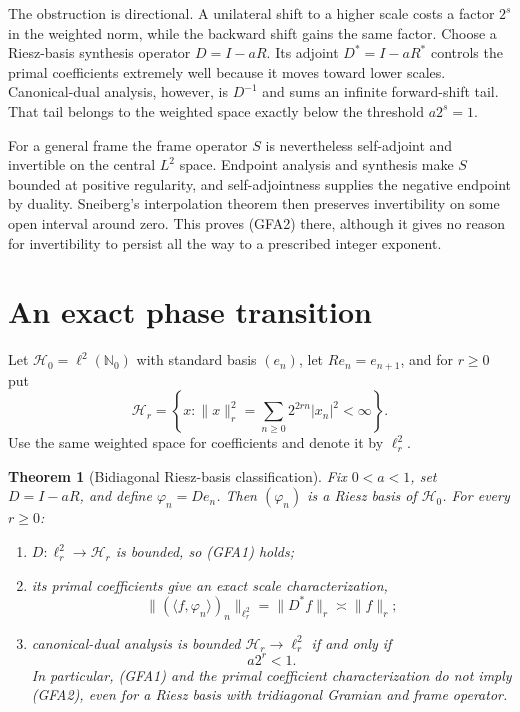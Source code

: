 \documentclass[11pt]{article}
\newtheorem{theorem}{Theorem}
\begin{document}
The obstruction is directional. A unilateral shift to a higher scale costs
a factor $2^s$ in the weighted norm, while the backward shift gains the same
factor. Choose a Riesz-basis synthesis operator $D=I-aR$. Its adjoint
$D^*=I-aR^*$ controls the primal coefficients extremely well because it moves
toward lower scales. Canonical-dual analysis, however, is $D^{-1}$ and sums
an infinite forward-shift tail. That tail belongs to the weighted space
exactly below the threshold $a2^s=1$.

For a general frame the frame operator $S$ is nevertheless self-adjoint and
invertible on the central $L^2$ space. Endpoint analysis and synthesis make
$S$ bounded at positive regularity, and self-adjointness supplies the negative
endpoint by duality. Sneiberg's interpolation theorem then preserves
invertibility on some open interval around zero. This proves (GFA2) there,
although it gives no reason for invertibility to persist all the way to a
prescribed integer exponent.

\section{An exact phase transition}

Let $\mathcal H_0=\ell^2(\mathbb N_0)$ with standard basis $(e_n)$, let
$R e_n=e_{n+1}$, and for $r\geq0$ put
\[
 \mathcal H_r=\left\{x:\|x\|_r^2=
 \sum_{n\geq0}2^{2rn}|x_n|^2<\infty\right\}.
\]
Use the same weighted space for coefficients and denote it by $\ell^2_r$.

\begin{theorem}[Bidiagonal Riesz-basis classification]\label{thm:shift}
Fix $0<a<1$, set $D=I-aR$, and define $\varphi_n=De_n$. Then
$(\varphi_n)$ is a Riesz basis of $\mathcal H_0$. For every $r\geq0$:
\begin{enumerate}[label=\textup{(\roman*)},leftmargin=2.1em]
\item $D:\ell^2_r\to\mathcal H_r$ is bounded, so \emph{(GFA1)} holds;
\item its primal coefficients give an exact scale characterization,
\[
 \|(\langle f,\varphi_n\rangle)_n\|_{\ell^2_r}
 =\|D^*f\|_r\asymp\|f\|_r;
\]
\item canonical-dual analysis is bounded $\mathcal H_r\to\ell^2_r$ if and
only if
\[
 a2^r<1.
\]
In particular, (GFA1) and the primal coefficient characterization do not imply
(GFA2), even for a Riesz basis with tridiagonal Gramian and frame operator.
\end{enumerate}
\end{theorem}
\end{document}
